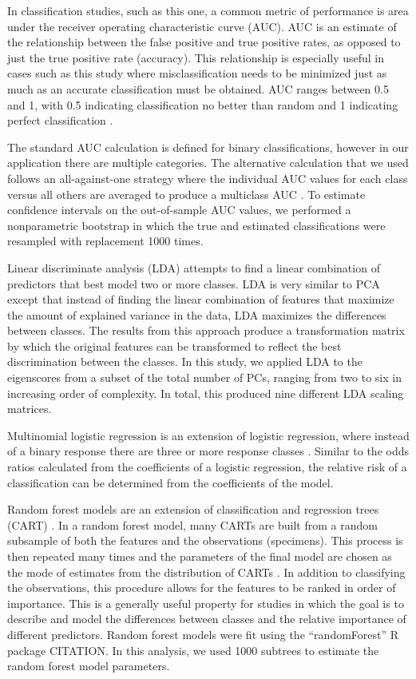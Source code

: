 \documentclass[12pt,letterpaper]{article}
\begin{document}
In classification studies, such as this one, a common metric of performance is area under the receiver operating characteristic curve (AUC). AUC is an estimate of the relationship between the false positive and true positive rates, as opposed to just the true positive rate (accuracy). This relationship is especially useful in cases such as this study where misclassification needs to be minimized just as much as an accurate classification must be obtained. AUC ranges between 0.5 and 1, with 0.5 indicating classification no better than random and 1 indicating perfect classification \citep{Hastie2009}.

The standard AUC calculation is defined for binary classifications, however in our application there are multiple categories. The alternative calculation that we used follows an all-against-one strategy where the individual AUC values for each class versus all others are averaged to produce a multiclass AUC \citep{Hand2001}. To estimate confidence intervals on the out-of-sample AUC values, we performed a nonparametric bootstrap in which the true and estimated classifications were resampled with replacement 1000 times.

Linear discriminate analysis (LDA) attempts to find a linear combination of predictors that best model two or more classes. LDA is very similar to PCA except that instead of finding the linear combination of features that maximize the amount of explained variance in the data, LDA maximizes the differences between classes. The results from this approach produce a transformation matrix by which the original features can be transformed to reflect the best discrimination between the classes. In this study, we applied LDA to the eigenscores from a subset of the total number of PCs, ranging from two to six in increasing order of complexity. In total, this produced nine different LDA scaling matrices. 

Multinomial logistic regression is an extension of logistic regression, where instead of a binary response there are three or more response classes \citep{Venables2002a}. Similar to the odds ratios calculated from the coefficients of a logistic regression, the relative risk of a classification can be determined from the coefficients of the model.

Random forest models are an extension of classification and regression trees (CART) \citep{Breiman1984,Breiman2001}. In a random forest model, many CARTs are built from a random subsample of both the features and the observations (specimens). This process is then repeated many times and the parameters of the final model are chosen as the mode of estimates from the distribution of CARTs \citep{Breiman2001}. In addition to classifying the observations, this procedure allows for the features to be ranked in order of importance. This is a generally useful property for studies in which the goal is to describe and model the differences between classes and the relative importance of different predictors. Random forest models were fit using the ``randomForest'' R package CITATION. In this analysis, we used 1000 subtrees to estimate the random forest model parameters. 
\end{document}
